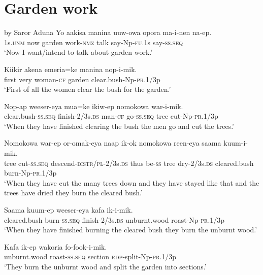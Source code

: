 \section{Garden work}
 by Saror Aduna
\ea\label{ex:a:x1}
\gll  Yo  aakisa  manina  uuw-owa  opora  ma-i-nen  na-ep. \\
1s.\textsc{unm}  now  garden  work-\textsc{nmz}  talk  say-Np-\textsc{fu}.1s  say-\textsc{ss.seq} \\
\glt ‘Now I want/intend to talk about garden work.’ \\
\z


\ea\label{ex:a:x2}
\gll  Kiikir  akena  emeria=ke  manina  nop-i-mik. \\
first  very  woman-\textsc{cf}  garden  clear.bush-Np-\textsc{pr}.1/3p \\
\glt ‘First of all the women clear the bush for the garden.’ \\
\z


\ea\label{ex:a:x3}
\gll  Nop-ap  weeser-eya  mua=ke  ikiw-ep  nomokowa         war-i-mik. \\
clear.bush-\textsc{ss.seq}  finish-2/3s.\textsc{ds}  man-\textsc{cf}  go-\textsc{ss.seq}  tree  cut-Np-\textsc{pr}.1/3p \\


\glt ‘When they have finished clearing the bush the men go and cut the trees.’ \\
\z


\ea\label{ex:a:x4}
\gll  Nomokowa  war-ep  or-omak-eya  naap  ik-ok  nomokowa     reen-eya  saama  kuum-i-mik. \\
tree  cut-\textsc{ss.seq}  descend-\textsc{distr}/\textsc{pl}-2/3s.\textsc{ds}  thus  be-\textsc{ss}  tree  dry-2/3s.\textsc{ds}  cleared.bush  burn-Np-\textsc{pr}.1/3p \\


\glt ‘When they have cut the many trees down and they have stayed like that and the trees have dried they burn the cleared bush.’ \\
\z


\ea\label{ex:a:x5}
\gll  Saama  kuum-ep  weeser-eya  kafa  ik-i-mik. \\
cleared.bush  burn-\textsc{ss.seq}  finish-2/3s.\textsc{ds}  unburnt.wood  roast-Np-\textsc{pr}.1/3p \\
\glt ‘When they have finished burning the cleared bush they burn the unburnt wood.’ \\
\z


\ea\label{ex:a:x6}
\gll  Kafa  ik-ep  wakoria  fo-fook-i-mik. \\
unburnt.wood  roast-\textsc{ss.seq}  section  \textsc{rdp}-split-Np-\textsc{pr}.1/3p \\
\glt ‘They burn the unburnt wood and split the garden into sections.’ \\
\z


